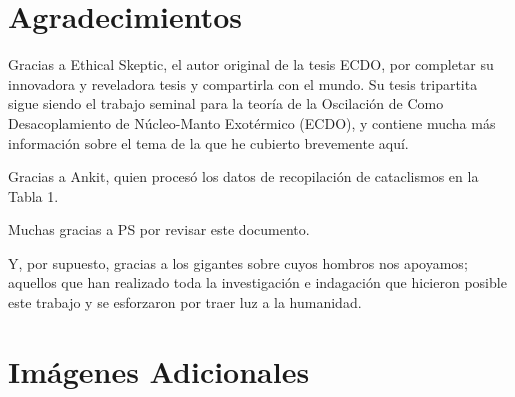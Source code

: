 \documentclass[10pt,twocolumn,letterpaper]{article}
\begin{document}
\section{Agradecimientos}

Gracias a Ethical Skeptic, el autor original de la tesis ECDO, por completar su innovadora y reveladora tesis y compartirla con el mundo. Su tesis tripartita \cite{1} sigue siendo el trabajo seminal para la teoría de la Oscilación de Como Desacoplamiento de Núcleo-Manto Exotérmico (ECDO), y contiene mucha más información sobre el tema de la que he cubierto brevemente aquí.

Gracias a Ankit, quien procesó los datos de recopilación de cataclismos en la Tabla 1.

Muchas gracias a PS por revisar este documento.

Y, por supuesto, gracias a los gigantes sobre cuyos hombros nos apoyamos; aquellos que han realizado toda la investigación e indagación que hicieron posible este trabajo y se esforzaron por traer luz a la humanidad.

\clearpage
\twocolumn

\section{Imágenes Adicionales}
\end{document}
